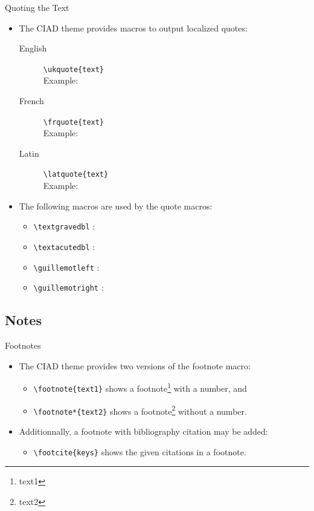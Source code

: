 \documentclass[english,sectioncirclenumberstyle]{ciadbeamer}
\begin{document}
\begin{frame}{Quoting the Text}
	\begin{itemize}
	\item The CIAD theme provides macros to output localized quotes:
		\begin{description}
		\item[English] \texttt{{\textbackslash}ukquote\{text\}} \\
			Example: 
		\item[French] \texttt{{\textbackslash}frquote\{text\}} \\
			Example: 
		\item[Latin] \texttt{{\textbackslash}latquote\{text\}} \\
			Example: 
		\end{description}
	\vspace{1em}
	\item The following macros are used by the quote macros:
		\begin{itemize}
		\item \texttt{{\textbackslash}textgravedbl} : \textgravedbl
		\item \texttt{{\textbackslash}textacutedbl} : \textacutedbl
		\item \texttt{{\textbackslash}guillemotleft} : \guillemotleft
		\item \texttt{{\textbackslash}guillemotright} : \guillemotright
		\end{itemize}
	\end{itemize}
\end{frame}

\subsection{Notes}
\subsectiontableofcontentslide

\begin{frame}{Footnotes}
	\begin{itemize}
	\item The CIAD theme provides two versions of the footnote macro:
		\begin{itemize}
		\item \texttt{{\textbackslash}footnote\{text1\}} shows a footnote\footnote{text1} with a number, and
		\item \texttt{{\textbackslash}footnote*\{text2\}} shows a footnote\footnote*{text2} without a number.
		\end{itemize}
	\vspace{1em}
	\item Additionnally, a footnote with bibliography citation may be added:
		\begin{itemize}
		\item \texttt{{\textbackslash}footcite\{keys\}} shows the given citations in a footnote.
		\end{itemize}
	\end{itemize}
\end{frame}
\end{document}
